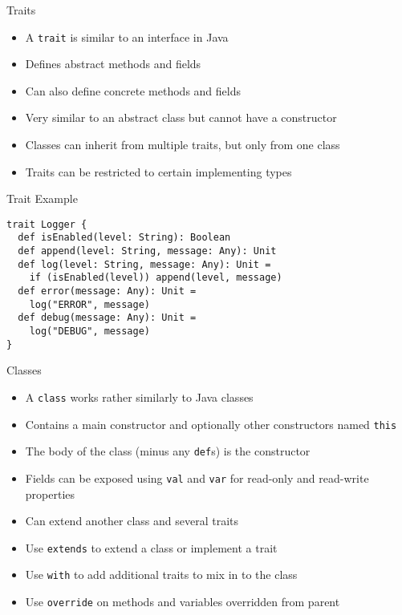 \documentclass{beamer}
\begin{document}
\begin{frame}{Traits}
\begin{itemize}
\item A \lstinline{trait} is similar to an interface in Java
\item Defines abstract methods and fields
\item Can also define concrete methods and fields
\item Very similar to an abstract class but cannot have a constructor
\item Classes can inherit from multiple traits, but only from one class
\item Traits can be restricted to certain implementing types
\end{itemize}
\end{frame}

\begin{frame}[fragile]{Trait Example}
\begin{lstlisting}
trait Logger {
  def isEnabled(level: String): Boolean
  def append(level: String, message: Any): Unit
  def log(level: String, message: Any): Unit =
    if (isEnabled(level)) append(level, message)
  def error(message: Any): Unit =
    log("ERROR", message)
  def debug(message: Any): Unit =
    log("DEBUG", message)
}
\end{lstlisting}
\end{frame}

\begin{frame}{Classes}
\begin{itemize}
\item A \lstinline{class} works rather similarly to Java classes
\item Contains a main constructor and optionally other constructors named \lstinline{this}
\item The body of the class (minus any \lstinline{def}s) is the constructor
\item Fields can be exposed using \lstinline{val} and \lstinline{var} for read-only
and read-write properties
\item Can extend another class and several traits
\item Use \lstinline{extends} to extend a class or implement a trait
\item Use \lstinline{with} to add additional traits to mix in to the class
\item Use \lstinline{override} on methods and variables overridden from parent
\end{itemize}
\end{frame}
\end{document}
